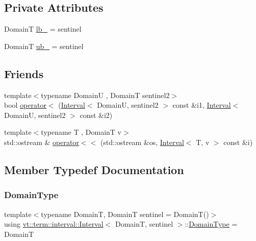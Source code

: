 \subsection*{Private Attributes}
\begin{DoxyCompactItemize}
\item 
DomainT \hyperlink{structvt_1_1term_1_1interval_1_1_interval_a12aa2c05e55f64d6b83f66fbeabddf47}{lb\+\_\+} = sentinel
\item 
DomainT \hyperlink{structvt_1_1term_1_1interval_1_1_interval_a74c71b9f525b0f282187490b2cbe3494}{ub\+\_\+} = sentinel
\end{DoxyCompactItemize}
\subsection*{Friends}
\begin{DoxyCompactItemize}
\item 
{\footnotesize template$<$typename DomainU , DomainT sentinel2$>$ }\\bool \hyperlink{structvt_1_1term_1_1interval_1_1_interval_ac749dc791f49126328a9a8c69e282e5f}{operator$<$} (\hyperlink{structvt_1_1term_1_1interval_1_1_interval}{Interval}$<$ DomainU, sentinel2 $>$ const \&i1, \hyperlink{structvt_1_1term_1_1interval_1_1_interval}{Interval}$<$ DomainU, sentinel2 $>$ const \&i2)
\item 
{\footnotesize template$<$typename T , DomainT v$>$ }\\std\+::ostream \& \hyperlink{structvt_1_1term_1_1interval_1_1_interval_a764fa3f5ff6c49067c4c36a35b498c8b}{operator$<$$<$} (std\+::ostream \&os, \hyperlink{structvt_1_1term_1_1interval_1_1_interval}{Interval}$<$ T, v $>$ const \&i)
\end{DoxyCompactItemize}


\subsection{Member Typedef Documentation}
\mbox{\label{structvt_1_1term_1_1interval_1_1_interval_a237ccc9805d839c82151945ad80b796c}} 
\subsubsection{\texorpdfstring{Domain\+Type}{DomainType}}
{\footnotesize\ttfamily template$<$typename DomainT, DomainT sentinel = Domain\+T()$>$ \\
using \hyperlink{structvt_1_1term_1_1interval_1_1_interval}{vt\+::term\+::interval\+::\+Interval}$<$ DomainT, sentinel $>$\+::\hyperlink{structvt_1_1term_1_1interval_1_1_interval_a237ccc9805d839c82151945ad80b796c}{Domain\+Type} =  DomainT}

